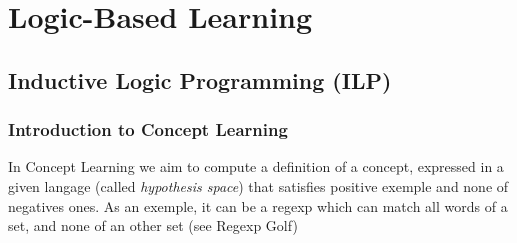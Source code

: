 \chapter{Logic-Based Learning} %
\label{cha: logic_learning}


	\section{Inductive Logic Programming (ILP)} %
	\label{sec:inductive_logic_programming}
		
		\subsection{Introduction to Concept Learning}

			In Concept Learning we aim to compute a definition of a concept, expressed in a given langage (called \emph{hypothesis space}) that satisfies positive exemple and none of negatives ones. As an exemple, it can be a regexp which can match all words of a set, and none of an other set (see Regexp Golf) 
